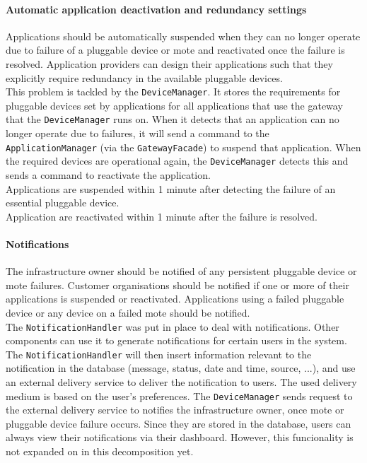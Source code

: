         \paragraph{Automatic application deactivation and redundancy settings}
            Applications should be automatically suspended when they can no longer
            operate due to failure of a pluggable device or mote and reactivated
            once the failure is resolved. Application providers can design their
            applications such that they explicitly require redundancy in
            the available pluggable devices. \\
            This problem is tackled by the \texttt{DeviceManager}. It
            stores the requirements for pluggable devices set by applications for all
            applications that use the gateway that the \texttt{DeviceManager}
            runs on. When it detects that an application can no longer operate
            due to failures, it will send a command to the \texttt{ApplicationManager}
            (via the \texttt{GatewayFacade})
            to suspend that application. When the required devices are operational
            again, the \texttt{DeviceManager} detects this and sends a
            command to reactivate the application. \\

            Applications are suspended within 1 minute after detecting
            the failure of an essential pluggable device. \\
            Application are reactivated within 1 minute after the failure is resolved.

        \paragraph{Notifications}
            The infrastructure owner should be notified of any persistent
            pluggable device or mote failures. Customer organisations should be
            notified if one or more of their applications is suspended or
            reactivated. Applications using a failed pluggable device or any device
            on a failed mote should be notified. \\
            The \texttt{NotificationHandler} was put in place to deal with
            notifications. Other components can use it to generate notifications for
            certain users in the system. The \texttt{NotificationHandler} will then
            insert information relevant to the notification in the database (message,
            status, date and time, source, ...), and use an external delivery
            service to deliver the notification to users. The used delivery medium
            is based on the user's preferences. The \texttt{DeviceManager} sends request
            to the external delivery service to notifies the 
            infrastructure owner, once mote or pluggable device failure occurs.
            Since they are stored in the database, users can always view
            their notifications via their dashboard. However, this funcionality is not
            expanded on in this decomposition yet. \\


